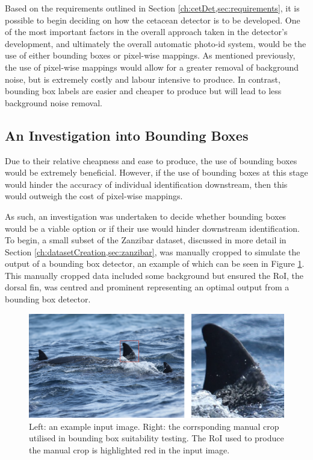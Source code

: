 Based on the requirements outlined in Section \ref{ch:cetDet,sec:requirements}, it is possible to begin deciding on how the cetacean detector is to be developed. One of the most important factors in the overall approach taken in the detector's development, and ultimately the overall automatic photo-id system, would be the use of either bounding boxes or pixel-wise mappings. As mentioned previously, the use of pixel-wise mappings would allow for a greater removal of background noise, but is extremely costly and labour intensive to produce. In contrast, bounding box labels are easier and cheaper to produce but will lead to less background noise removal. 

\subsection{An Investigation into Bounding Boxes}\label{ch:cetDet,sec:deciding,sub:boundingBoxInvestigation}

Due to their relative cheapness and ease to produce, the use of bounding boxes would be extremely beneficial. However, if the use of bounding boxes at this stage would hinder the accuracy of individual identification downstream, then this would outweigh the cost of pixel-wise mappings. 

As such, an investigation was undertaken to decide whether bounding boxes would be a viable option or if their use would hinder downstream identification. To begin, a small subset of the Zanzibar dataset, discussed in more detail in Section \ref{ch:datasetCreation,sec:zanzibar}, was manually cropped to simulate the output of a bounding box detector, an example of which can be seen in Figure \ref{fig:manual-crop-example}. This manually cropped data included some background but ensured the RoI, the dorsal fin, was centred and prominent representing an optimal output from a bounding box detector. 

\begin{figure}
	\begin{center}
		\includegraphics[scale=0.6]{Chapter4/figs/manual-crop-example-updated.png}
	\end{center}
	\caption[Left: an example input image. Right: the corrsponding manual crop utilised in bounding box suitability testing.]{Left: an example input image. Right: the corrsponding manual crop utilised in bounding box suitability testing. The RoI used to produce the manual crop is highlighted red in the input image.}
	\label{fig:manual-crop-example}
\end{figure}

